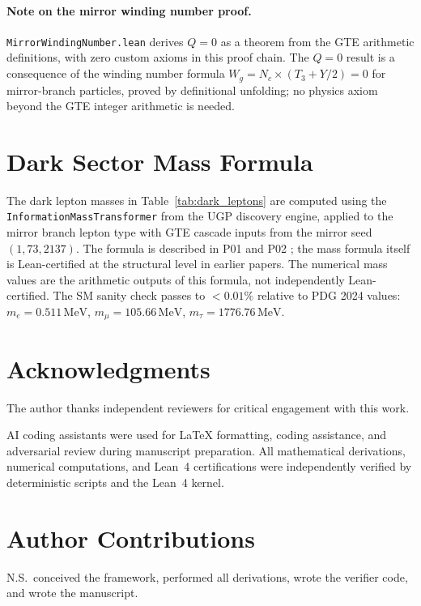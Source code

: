 \documentclass[11pt]{article}
\begin{document}
\paragraph{Note on the mirror winding number proof.}
\texttt{MirrorWindingNumber.lean} derives $Q=0$ as a theorem from the GTE arithmetic
definitions, with zero custom axioms in this proof chain. The $Q=0$ result is a consequence of the winding
number formula $W_g = N_c \times (T_3 + Y/2) = 0$ for mirror-branch particles, proved
by definitional unfolding; no physics axiom beyond the GTE integer arithmetic is needed.

\section{Dark Sector Mass Formula}
\label{app:mass_formula}

The dark lepton masses in Table~\ref{tab:dark_leptons} are computed using the
\texttt{InformationMassTransformer} from the UGP discovery engine, applied to the
mirror branch lepton type with GTE cascade inputs from the mirror seed $(1, 73, 2137)$.
The formula is described in P01 \cite{Spivack2025_FirstPrinciplesSM} and P02
\cite{SpivackGTESpectrum}; the mass formula itself is Lean-certified at the structural
level in earlier papers. The numerical mass values are the arithmetic outputs of this
formula, not independently Lean-certified. The SM sanity check passes to $<0.01\%$
relative to PDG 2024 \cite{ParticleDataGroup2024} values:
$m_e = 0.511\,\mathrm{MeV}$, $m_\mu = 105.66\,\mathrm{MeV}$, $m_\tau = 1776.76\,\mathrm{MeV}$.


\section*{Acknowledgments}
The author thanks independent reviewers for critical engagement with this work.

AI coding assistants were used for \LaTeX{} formatting, coding assistance, and adversarial review during manuscript preparation. All mathematical derivations, numerical computations, and Lean~4 certifications were independently verified by deterministic scripts and the Lean~4 kernel.

\section*{Author Contributions}
N.S.\ conceived the framework, performed all derivations, wrote the verifier code, and wrote the manuscript.
\end{document}
